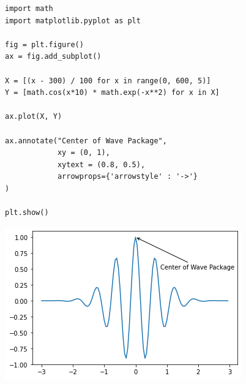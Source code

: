 \begin{frame}[fragile]
%
\begin{codebox}[Example: Annotations, width=.6\linewidth, nobeforeafter, equal height group = grpXmpAnnotate]
\begin{verbatim}
import math
import matplotlib.pyplot as plt

fig = plt.figure()
ax = fig.add_subplot()

X = [(x - 300) / 100 for x in range(0, 600, 5)]
Y = [math.cos(x*10) * math.exp(-x**2) for x in X]

ax.plot(X, Y)

ax.annotate("Center of Wave Package",
            xy = (0, 1),
            xytext = (0.8, 0.5),
            arrowprops={'arrowstyle' : '->'}
)

plt.show()
\end{verbatim}
\end{codebox}
%
\begin{tcolorbox}[title=Output: Annotations, width=.34\linewidth, nobeforeafter, equal height group = grpXmpAnnotate]
		
	\vspace{50pt}
	\hspace{-13pt}
	\includegraphics[width=1.22\linewidth]{./gfx/plt-overlay-simple}
\end{tcolorbox}
%
\end{frame}


